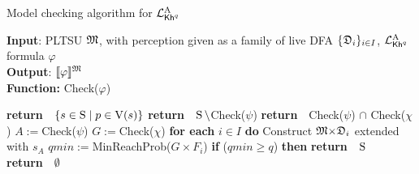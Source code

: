 \renewcommand{\Check}[1]{Check(#1)}%
\newcommand{\MinReachProb}[1]{MinReachProb(#1)}%
\newcommand{\Return}{\!\textbf{return}\ \ }
\begin{algorithm}[tb]
  \caption{Model checking algorithm for $\PKhadapt$}
  \label{alg:mc:pkhadapt}
  \footnotesize
  \textbf{Input}: PLTSU $\model$, with perception given as a family of live DFA $\{\dfa_i\}_{i\in I}$, $\PKhadapt$ formula $\varphi$\\
  \textbf{Output}: $\truthset{\model}{\varphi}$ \\
  \textbf{Function:} \Check{$\varphi$} 
  \begin{algorithmic}[1] %
    \SWITCH {$\varphi$}
      {\Return {$\{{s\in\S}\mid {p\in\V(s)}\}$}}
    \CASELINE{${\neg\psi}$}
      {\Return{$\S\setminus{}$\Check{$\psi$}}}
    \CASELINE{${\psi\wedge\chi}$}
      {\Return{\Check{$\psi$} $\cap$ \Check{$\chi$}}}
          \STATE \quad\quad $A:={}$\Check{$\psi$}
          \STATE \quad\quad $G:={}$\Check{$\chi$}
          \STATE \quad\quad \textbf{for each} {$i\in I$} \textbf{do} 
              \STATE \quad\quad\quad  Construct $\model{\times}\dfa_i$ extended with $s_A$\;
              \STATE \quad\quad\quad $\mathit{qmin}:={}$\MinReachProb{$G{\times}F_i$}\;
              \STATE \quad\quad\quad \textbf{if} {($\mathit{qmin}\geq q$)} \textbf{then}  {\Return{$\S$}}\label{alg:ln:rettrue}
              \STATE \quad\quad \Return{$\emptyset$}\label{alg:ln:retfalse}
  \end{algorithmic}
  \end{algorithm}





